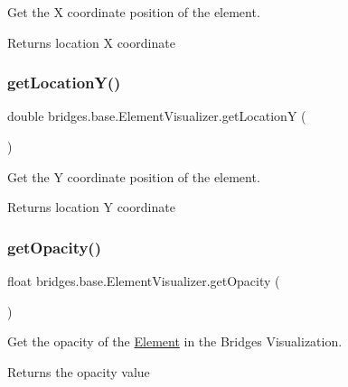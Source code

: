 Get the X coordinate position of the element. 

\begin{DoxyReturn}{Returns}
location X coordinate 
\end{DoxyReturn}
\mbox{\label{classbridges_1_1base_1_1_element_visualizer_ac170e945106f43cac3a3bdd950c60235}} 
\subsubsection{\texorpdfstring{getLocationY()}{getLocationY()}}
{\footnotesize\ttfamily double bridges.\+base.\+Element\+Visualizer.\+get\+LocationY (\begin{DoxyParamCaption}{ }\end{DoxyParamCaption})}



Get the Y coordinate position of the element. 

\begin{DoxyReturn}{Returns}
location Y coordinate 
\end{DoxyReturn}
\mbox{\label{classbridges_1_1base_1_1_element_visualizer_ab86ff39f17f8d1766670b18be88b5492}} 
\subsubsection{\texorpdfstring{getOpacity()}{getOpacity()}}
{\footnotesize\ttfamily float bridges.\+base.\+Element\+Visualizer.\+get\+Opacity (\begin{DoxyParamCaption}{ }\end{DoxyParamCaption})}



Get the opacity of the \mbox{\hyperlink{classbridges_1_1base_1_1_element}{Element}} in the Bridges Visualization. 

\begin{DoxyReturn}{Returns}
the opacity value 
\end{DoxyReturn}
\mbox{\label{classbridges_1_1base_1_1_element_visualizer_a8ef0825745e49f32b57e4bf6c891b57e}} 
